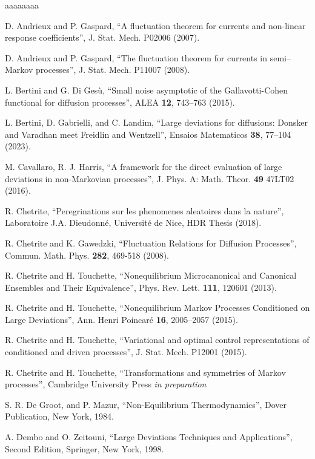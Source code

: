\documentclass[a4paper,11pt]{article}
\numberwithin{equation}{section}
\begin{document}
\begin{thebibliography}{aaaaaaaa}

 D. Andrieux and P. Gaspard, ``A fluctuation theorem for currents and non-linear response coefficients'', J. Stat. Mech. P02006 (2007).

 D. Andrieux and P. Gaspard, ``The fluctuation theorem for currents in semi–Markov processes'', J. Stat. Mech. P11007 (2008).

 L. Bertini and G. Di Ges\`u, ``Small noise asymptotic of the Gallavotti-Cohen functional for diffusion processes'', ALEA {\bf 12}, 743–763 (2015).

 L. Bertini, D. Gabrielli, and C. Landim, ``Large deviations for diffusions: Donsker and Varadhan meet Freidlin and Wentzell'', Ensaios Matematicos {\bf 38}, 77–104 (2023).

 M. Cavallaro, R. J. Harris, ``A framework for the direct evaluation of large deviations in non-Markovian processes'', J. Phys. A: Math. Theor. {\bf 49} 47LT02 (2016).

 R. Chetrite, ``Peregrinations sur les phenomenes aleatoires dans la nature'', Laboratoire J.A. Dieudonn\'e, Universit\'e de Nice, HDR Thesis (2018).

 R. Chetrite and K. Gawedzki, ``Fluctuation Relations for Diffusion Processes'', Commun. Math. Phys. {\bf 282}, 469-518 (2008).

 R.  Chetrite and H. Touchette,  ``Nonequilibrium Microcanonical and Canonical Ensembles and Their Equivalence'', Phys. Rev. Lett. {\bf 111}, 120601 (2013).

 R.  Chetrite and H. Touchette,  ``Nonequilibrium Markov Processes Conditioned on Large Deviations'',  Ann.  Henri Poincar\'e {\bf 16}, 2005–2057 (2015).

 R.  Chetrite and H. Touchette,  ``Variational and optimal control representations of conditioned and driven processes'', J. Stat. Mech. P12001 (2015).

 R.  Chetrite and H. Touchette, ``Transformations and symmetries of Markov processes'', Cambridge University Press \emph{in preparation}

 S. R. De Groot, and P. Mazur,  ``Non-Equilibrium Thermodynamics'', Dover Publication, New York, 1984.

 A. Dembo and O. Zeitouni, ``Large Deviations Techniques and Applications'', Second Edition, Springer, New York, 1998.


\end{thebibliography}
\end{document}

